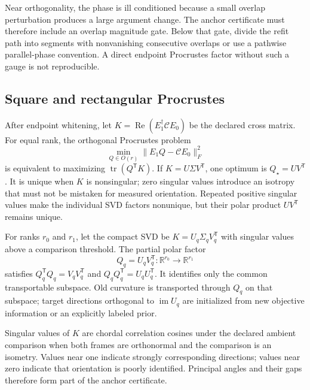 \documentclass[10pt,twocolumn]{article}
\theoremstyle{definition}
\theoremstyle{remark}
\newcommand{\R}{\mathbb R}
\newcommand{\Rea}{\operatorname{Re}}
\newcommand{\im}{\operatorname{im}}
\newcommand{\tr}{\operatorname{tr}}
\begin{document}
Near orthogonality, the phase is ill conditioned because a small overlap
perturbation produces a large argument change.  The anchor certificate must
therefore include an overlap magnitude gate.  Below that gate, divide the
refit path into segments with nonvanishing consecutive overlaps or use a
pathwise parallel-phase convention.  A direct endpoint Procrustes factor
without such a gauge is not reproducible.

\subsection{Square and rectangular Procrustes}

After endpoint whitening, let
$K=\Rea(E_1^\dagger\mathcal C E_0)$ be the declared cross matrix.  For equal
rank, the orthogonal Procrustes problem
\begin{equation}
 \min_{Q\in O(r)}\|E_1Q-\mathcal C E_0\|_F^2
 \label{eq:appproblem}
\end{equation}
is equivalent to maximizing $\tr(Q^{\mathsf T}K)$.  If
$K=U\Sigma V^{\mathsf T}$, one optimum is $Q_\star=UV^{\mathsf T}$
\cite{Schonemann1966}.  It is unique when $K$ is nonsingular; zero singular
values introduce an isotropy that must not be mistaken for measured
orientation.  Repeated positive singular values make the individual SVD
factors nonunique, but their polar product $UV^{\mathsf T}$ remains unique.

For ranks $r_0$ and $r_1$, let the compact SVD be
$K=U_q\Sigma_qV_q^{\mathsf T}$ with singular values above a comparison
threshold.  The partial polar factor
\begin{equation}
 Q_q=U_qV_q^{\mathsf T}:\R^{r_0}\to\R^{r_1}
 \label{eq:apppartialpolar}
\end{equation}
satisfies
$Q_q^{\mathsf T}Q_q=V_qV_q^{\mathsf T}$ and
$Q_qQ_q^{\mathsf T}=U_qU_q^{\mathsf T}$.  It identifies only the common
transportable subspace.  Old curvature is transported through $Q_q$ on that
subspace; target directions orthogonal to $\im U_q$ are initialized from new
objective information or an explicitly labeled prior.

Singular values of $K$ are chordal correlation cosines under the declared
ambient comparison when both frames are orthonormal and the comparison is an
isometry.  Values near one indicate strongly corresponding directions;
values near zero indicate that orientation is poorly identified.  Principal
angles and their gaps therefore form part of the anchor certificate.
\end{document}
